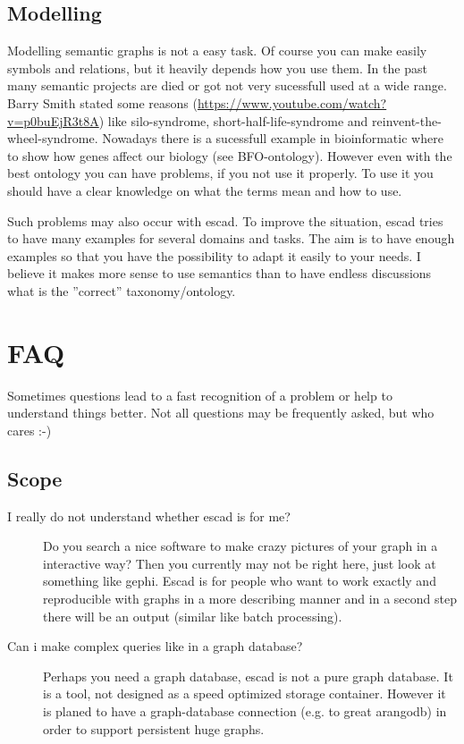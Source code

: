 \documentclass[a4paper, 12pt, openany]{scrbook}
\begin{document}
\subsection{Modelling}
Modelling semantic graphs is not a easy task. Of course you can make easily symbols and relations, but it heavily depends how you use them. In the past many semantic projects are died or got not very sucessfull used at a wide range. Barry Smith stated some reasons (\url{https://www.youtube.com/watch?v=p0buEjR3t8A}) like silo-syndrome, short-half-life-syndrome and reinvent-the-wheel-syndrome. Nowadays there is a sucessfull example in bioinformatic where to show how genes affect our biology (see BFO-ontology). However even with the best ontology you can have problems, if you not use it properly. To use it you should have a clear knowledge on what the terms mean and how to use.

Such problems may also occur with escad. To improve the situation, escad tries to have many examples for several domains and tasks. The aim is to have enough examples so that you have the possibility to adapt it easily to your needs. I believe it makes more sense to use semantics than to have endless discussions what is the ''correct'' taxonomy/ontology.
\section{FAQ}
Sometimes questions lead to a fast recognition of a problem or help to understand things better. Not all questions may be frequently asked, but who cares :-)
\subsection{Scope}
\begin{description}
\item[I really do not understand whether escad is for me?] Do you search a nice software to make crazy pictures of your graph in a interactive way? Then you currently may not be right here, just look at something like gephi. Escad is for people who want to work exactly and reproducible with graphs in a more describing manner and in a second step there will be an output (similar like batch processing).
\item[Can i make complex queries like in a graph database?] Perhaps you need a graph database, escad is not a pure graph database. It is a tool, not designed as a speed optimized storage container. However it is planed to have a graph-database connection (e.g. to great arangodb) in order to support persistent huge graphs.
\end{description}
\end{document}
